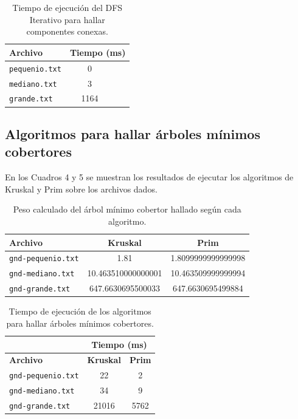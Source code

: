 \documentclass[11pt]{article}
\begin{document}
\begin{table}[t]
   \centering
   \begin{tabular}{lcc}
      \hline
      \textbf{Archivo} & \multicolumn{2}{c}{\textbf{Tiempo (ms)}}   \\ \hline
      \texttt{pequenio.txt} & 0 \\
      \texttt{mediano.txt} & 3 \\
      \texttt{grande.txt} & 1164 \\ \hline
   \end{tabular}
   \label{tab:tiemposccit}
   \caption{Tiempo de ejecución del DFS Iterativo para hallar componentes conexas.}
\end{table}

\subsection{Algoritmos para hallar árboles mínimos cobertores}

En los Cuadros 4 y 5 se muestran los resultados de ejecutar los algoritmos de Kruskal
y Prim sobre los archivos dados. \\


\begin{table}[h]
   \centering
   \begin{tabular}{lcc}
      \hline
      \textbf{Archivo} & \multicolumn{1}{c}{\textbf{Kruskal}} & \multicolumn{1}{c}{\textbf{Prim}} \\ \hline
      \texttt{gnd-pequenio.txt} & 1.81 & 1.8099999999999998 \\
      \texttt{gnd-mediano.txt} & 10.463510000000001 & 10.463509999999994 \\
      \texttt{gnd-grande.txt} & 647.6630695500033 & 647.6630695499884 \\ \hline
   \end{tabular}
   \label{tab:pesos}
   \caption{Peso calculado del árbol mínimo cobertor hallado según cada algoritmo.}
\end{table}

\begin{table}[h]
   \centering
   \begin{tabular}{lcc}
      \hline
      & \multicolumn{2}{c}{\textbf{Tiempo (ms)}}   \\ \hline
      \textbf{Archivo} & \multicolumn{1}{c}{\textbf{Kruskal}} & \multicolumn{1}{c}{\textbf{Prim}} \\ \hline
      \texttt{gnd-pequenio.txt} & 22 & 2 \\
      \texttt{gnd-mediano.txt} & 34 & 9 \\
      \texttt{gnd-grande.txt} &  21016 & 5762 \\ \hline
   \end{tabular}
   \label{tab:tiemposamc}
   \caption{Tiempo de ejecución de los algoritmos para hallar árboles mínimos cobertores.}
\end{table}
\end{document}
